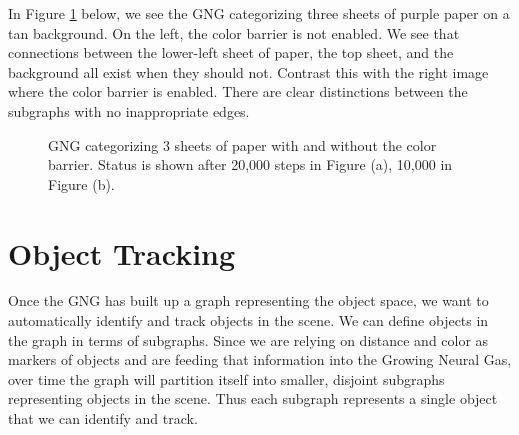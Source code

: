 \documentclass{article}
\renewcommand{\|}{\origbar} %
\begin{document}
In Figure \ref{fig:colorBarrier} below, we see the GNG categorizing three sheets of purple paper on a tan background. On the left, the color barrier is not enabled. We see that connections between the lower-left sheet of paper, the top sheet, and the background all exist when they should not. Contrast this with the right image where the color barrier is enabled. There are clear distinctions between the subgraphs with no inappropriate edges.

\begin{figure}[h!]
  \centering


  \caption{GNG categorizing 3 sheets of paper with and without the color barrier. Status is shown after 20,000 steps in Figure (a), 10,000 in Figure (b).}
  \label{fig:colorBarrier}
\end{figure}

\section{Object Tracking}
\label{sec:objectTracking}

Once the GNG has built up a graph representing the object space, we want to automatically identify and track objects in the scene. We can define objects in the graph in terms of subgraphs. Since we are relying on distance and color as markers of objects and are feeding that information into the Growing Neural Gas, over time the graph will partition itself into smaller, disjoint subgraphs representing objects in the scene. Thus each subgraph represents a single object that we can identify and track.
\end{document}
